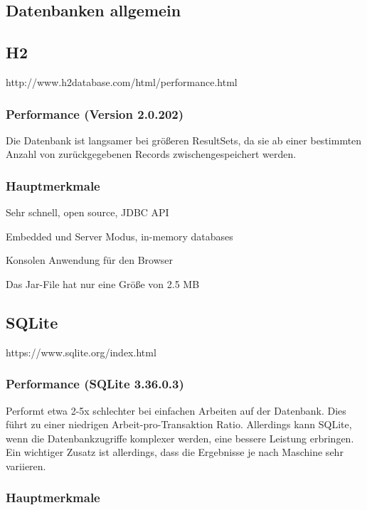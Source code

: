 \subsection{Datenbanken allgemein}

\subsection{H2}
http://www.h2database.com/html/performance.html

\subsubsection{Performance (Version 2.0.202)}
Die Datenbank ist langsamer bei größeren ResultSets, da sie ab einer bestimmten Anzahl von zurückgegebenen Records zwischengespeichert werden.

\subsubsection{Hauptmerkmale}

\begin{compactitem}
    \item Sehr schnell, open source, JDBC API 
    \item Embedded und Server Modus, in-memory databases         
    \item Konsolen Anwendung für den Browser
    \item Das Jar-File hat nur eine Größe von 2.5 MB
\end{compactitem}

\subsection{SQLite}
https://www.sqlite.org/index.html 

\subsubsection{Performance (SQLite 3.36.0.3)}
Performt etwa 2-5x schlechter bei einfachen Arbeiten auf der Datenbank. Dies führt zu einer niedrigen Arbeit-pro-Transaktion Ratio. Allerdings kann SQLite, wenn die Datenbankzugriffe komplexer werden, eine bessere Leistung erbringen. Ein wichtiger Zusatz ist allerdings, dass die Ergebnisse je nach Maschine sehr variieren. 

\subsubsection{Hauptmerkmale}


